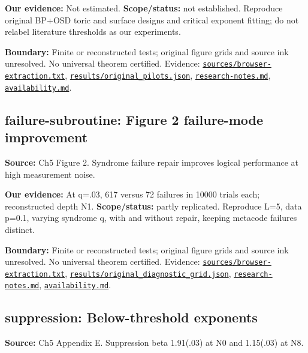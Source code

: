 \documentclass[11pt]{article}
\begin{document}
\textbf{Our evidence:} Not estimated. \textbf{Scope/status:} not established. Reproduce original BP+OSD toric and surface designs and critical exponent fitting; do not relabel literature thresholds as our experiments.

\textbf{Boundary:} Finite or reconstructed tests; original figure grids and source ink unresolved. No universal theorem certified. Evidence: \href{https://github.com/alectionary/vibe-math/blob/master/formalization/quintavalle-hgp/sources/browser-extraction.txt}{\nolinkurl{sources/browser-extraction.txt}}, \href{https://github.com/alectionary/vibe-math/blob/master/formalization/quintavalle-hgp/results/original_pilots.json}{\nolinkurl{results/original_pilots.json}}, \href{https://github.com/alectionary/vibe-math/blob/master/formalization/quintavalle-hgp/research-notes.md}{\nolinkurl{research-notes.md}}, \href{https://github.com/alectionary/vibe-math/blob/master/formalization/quintavalle-hgp/availability.md}{\nolinkurl{availability.md}}.
\subsection{failure-subroutine: Figure 2 failure-mode improvement}
\label{claim:failure-subroutine}
\textbf{Source:} Ch5 Figure 2. Syndrome failure repair improves logical performance at high measurement noise.

\textbf{Our evidence:} At q=.03, 617 versus 72 failures in 10000 trials each; reconstructed depth N1. \textbf{Scope/status:} partly replicated. Reproduce L=5, data p=0.1, varying syndrome q, with and without repair, keeping metacode failures distinct.

\textbf{Boundary:} Finite or reconstructed tests; original figure grids and source ink unresolved. No universal theorem certified. Evidence: \href{https://github.com/alectionary/vibe-math/blob/master/formalization/quintavalle-hgp/sources/browser-extraction.txt}{\nolinkurl{sources/browser-extraction.txt}}, \href{https://github.com/alectionary/vibe-math/blob/master/formalization/quintavalle-hgp/results/original_diagnostic_grid.json}{\nolinkurl{results/original_diagnostic_grid.json}}, \href{https://github.com/alectionary/vibe-math/blob/master/formalization/quintavalle-hgp/research-notes.md}{\nolinkurl{research-notes.md}}, \href{https://github.com/alectionary/vibe-math/blob/master/formalization/quintavalle-hgp/availability.md}{\nolinkurl{availability.md}}.
\subsection{suppression: Below-threshold exponents}
\label{claim:suppression}
\textbf{Source:} Ch5 Appendix E. Suppression beta 1.91(.03) at N0 and 1.15(.03) at N8.
\end{document}
